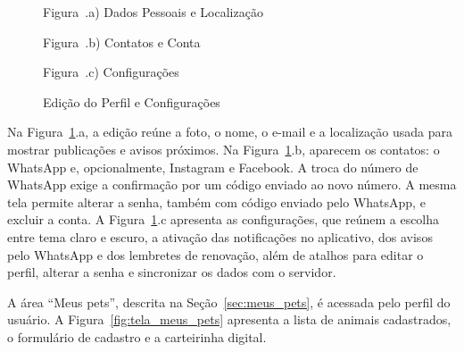 \begin{figure}[H]
    \centering
    \caption{Edição do Perfil e Configurações}
    \label{fig:tela_editar_perfil_config}
    \vspace{0.15cm}
    \begin{minipage}[t]{0.31\textwidth}
        \centering
        \par\vspace{0.12cm}
        {\small Figura~\thefigure.a) Dados Pessoais e Localização}
    \end{minipage}
    \hfill
    \begin{minipage}[t]{0.31\textwidth}
        \centering
        \par\vspace{0.12cm}
        {\small Figura~\thefigure.b) Contatos e Conta}
    \end{minipage}
    \hfill
    \begin{minipage}[t]{0.31\textwidth}
        \centering
        \par\vspace{0.12cm}
        {\small Figura~\thefigure.c) Configurações}
    \end{minipage}
    \par\vspace{0.12cm}
\end{figure}

Na Figura~\ref{fig:tela_editar_perfil_config}.a, a edição reúne a foto, o nome, o e-mail e a localização usada para mostrar publicações e avisos próximos. Na Figura~\ref{fig:tela_editar_perfil_config}.b, aparecem os contatos: o WhatsApp e, opcionalmente, Instagram e Facebook. A troca do número de WhatsApp exige a confirmação por um código enviado ao novo número. A mesma tela permite alterar a senha, também com código enviado pelo WhatsApp, e excluir a conta. A Figura~\ref{fig:tela_editar_perfil_config}.c apresenta as configurações, que reúnem a escolha entre tema claro e escuro, a ativação das notificações no aplicativo, dos avisos pelo WhatsApp e dos lembretes de renovação, além de atalhos para editar o perfil, alterar a senha e sincronizar os dados com o servidor.

A área ``Meus pets'', descrita na Seção~\ref{sec:meus_pets}, é acessada pelo perfil do usuário. A Figura~\ref{fig:tela_meus_pets} apresenta a lista de animais cadastrados, o formulário de cadastro e a carteirinha digital.

